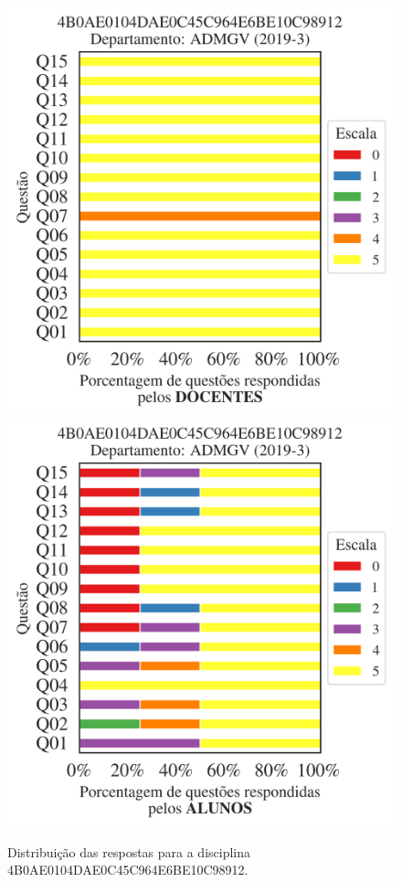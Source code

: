 \documentclass[a4paper,10pt]{article}
\begin{document}
\begin{figure}[h]
\centering
\includegraphics[width=0.485\linewidth]{analise_disciplina_departamento_ADMGV_4B0AE0104DAE0C45C964E6BE10C98912_docentes.png}
\includegraphics[width=0.485\linewidth]{analise_disciplina_departamento_ADMGV_4B0AE0104DAE0C45C964E6BE10C98912_alunos.png}
\caption{\label{fig:analise_geral_departamento}                Distribuição das respostas para a disciplina 4B0AE0104DAE0C45C964E6BE10C98912. }
\end{figure}
\end{document}
